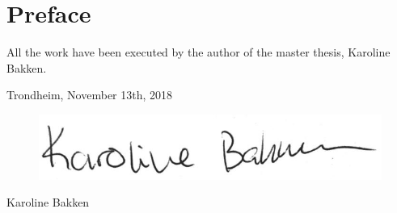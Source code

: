 \hypersetup{pageanchor=true}
%
\chapter*{Preface}
 \newline
\newline
All the work have been executed by the author of the master thesis, Karoline Bakken. 
\newline
\newline
\newline
\newline
\newline
\newline
\begin{center}
    Trondheim, November 13th, 2018
    \end{center}
\begin{figure}[H]
\centering
\includegraphics[scale=0.5]{figures/sign}
\end{figure}
\begin{center}
Karoline Bakken
\end{center}